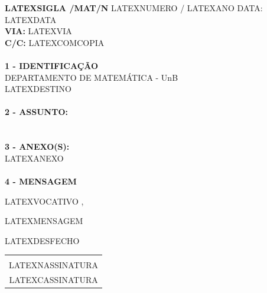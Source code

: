 \documentclass[12pt]{artigo}
\begin{document}
\vspace*{.8cm}
\timbrado
\parindent=2cm 
\setlength{\baselineskip}{5mm}
\noindent 
\begin{minipage}{16cm}
\vspace*{-12mm}
\parindent=2cm
\setlength{\baselineskip}{5mm}
\vspace*{.2cm}
\noindent
\small
{\bf  LATEXSIGLA /MAT/N\primo} LATEXNUMERO / LATEXANO \hfill {DATA:} {LATEXDATA}
\vum \\
{\bf VIA:} {LATEXVIA}  
\\
{\bf C/C:} {LATEXCOMCOPIA}  
\\
\mbox{} \hrulefill
\\
{\bf 1 - IDENTIFICA\c{C}\~AO} 
\\
\phantom{xxx}{\bf Proced\^encia:} {DEPARTAMENTO DE MATEM\'ATICA - UnB}
\\
 {LATEXDESTINO }
\\
\mbox{} \hrulefill
\\
{\bf 2 - ASSUNTO:} 
\\
\phantom{xxx}{LATEXASSUNTO }
\\
\mbox{} \hrulefill
\\
{\bf 3 - ANEXO(S):} 
\\
\phantom{xxx} {LATEXANEXO }
\\
\mbox{} \hrulefill
\\
{ \bf 4 - MENSAGEM} 
\end{minipage}
\setlength{\baselineskip}{9mm}

\vspace*{1.5cm} 
LATEXVOCATIVO ,
\vspace*{10mm} 

LATEXMENSAGEM
\vspace*{1.0cm} 

LATEXDESFECHO 
\vspace*{1.0cm} 
\hspace*{5.5cm}
\setlength{\baselineskip}{4mm}
\begin{center}
\begin{tabular}{c}
\hline \vspace*{-3mm}\\
LATEXNASSINATURA \\
{\small LATEXCASSINATURA}
\end{tabular}
\end{center}
\end{document}
